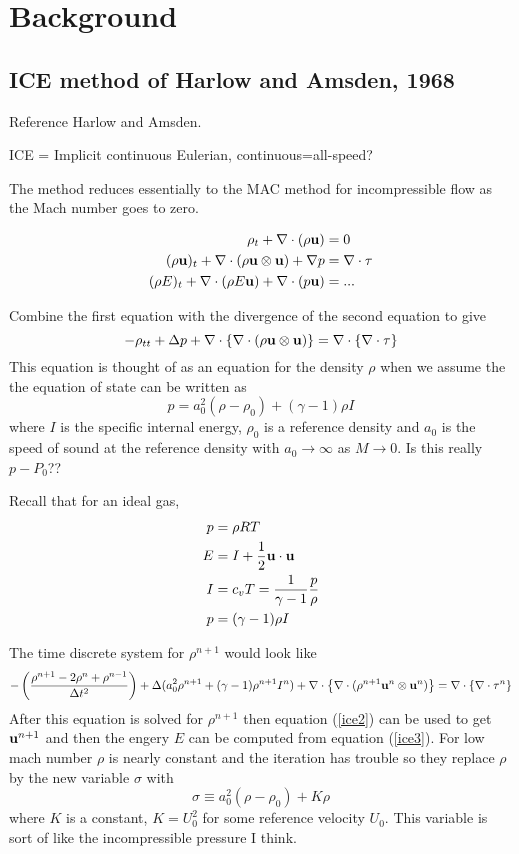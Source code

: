 \documentclass{article}
\begin{document}
\section{Background}

\subsection{ICE method of Harlow and Amsden, 1968}

Reference Harlow and Amsden\cite{Harlow68}.

ICE = Implicit continuous Eulerian, continuous=all-speed?

The method reduces essentially to the MAC method for incompressible flow as the Mach number
goes to zero.

\begin{align}
   \rho_t + \nabla\cdot( \rho{\bf u} ) &= 0 \label{ice1} \\
   (\rho{\bf u})_t + \nabla\cdot( \rho {\bf u}\otimes {\bf u} ) + \nabla p & = \nabla\cdot {\bf \tau} \label{ice2} \\
   (\rho E)_t + \nabla\cdot( \rho E {\bf u} ) + \nabla\cdot( p {\bf u} ) & = ... \label{ice2}
\end{align}

Combine the first equation with the divergence of the second equation to give
\[
    -\rho_{tt} + \Delta p + \nabla\cdot\left\{\nabla\cdot( \rho {\bf u}\otimes {\bf u} ) \right\} 
                  = \nabla\cdot\left\{ \nabla\cdot {\bf \tau} \right\} 
\]
This equation is thought of as an equation for the density $\rho$ when we assume the the
equation of state can be written as
\[
    p = a_0^2( \rho-\rho_0) + (\gamma-1) \rho I
\]
where $I$ is the specific internal energy, $\rho_0$ is a reference density and $a_0$ is the speed
of sound at the reference density with $a_0 \rightarrow \infty$ as $M\rightarrow 0$. 
Is this really $p-P_0$??

Recall that for an ideal gas,
\begin{align*}
  p &= \rho R T \\
  E &= I + {1\over 2}{\bf u}\cdot{\bf u} \\
  I &= c_v T = {1\over \gamma-1} {p \over \rho } \\
  p &= (\gamma-1) \rho I
\end{align*}

\newcommand{\rp}{\rho^{n+1}}
The time discrete system for $\rp$ would look like  
\[
   - \left( \rp -2\rho^n + \rho^{n-1} \over \Delta t^2 \right)
    + \Delta( a_0^2\rp + (\gamma-1)\rp I^n )  + \grad\cdot\left\{\grad\cdot( \rp \uv^n\otimes \uv^n ) \right\} 
                  = \grad\cdot\left\{ \grad\cdot \tauv^n \right\} 
\]
After this equation is solved for $\rp$ then equation (\ref{ice2}) can be used to get ${\bf u}^{n+1}$ and
then the engery $E$ can be computed from equation (\ref{ice3}).
For low mach number $\rho$ is nearly constant and the iteration has trouble so they replace $\rho$ by
the new variable $\sigma$ with
\[
     \sigma \equiv a_0^2( \rho-\rho_0) + K \rho
\]
where $K$ is a constant, $K=U_0^2$ for some reference velocity $U_0$. This variable is sort of
like the incompressible pressure I think.
\end{document}
